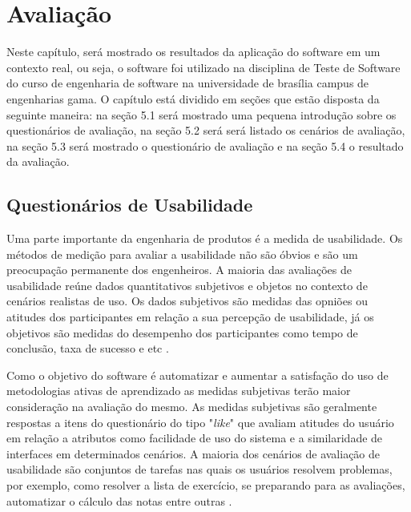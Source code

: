 \chapter{Avaliação}

Neste capítulo, será mostrado os resultados da aplicação do software em um contexto real, ou seja, o software foi
utilizado na disciplina de Teste de Software do curso de engenharia de software na universidade de brasília campus
de engenharias gama. O capítulo está dividido em seções que estão disposta da seguinte maneira: na seção 5.1 será mostrado
uma pequena introdução sobre os questionários de avaliação, na seção 5.2 será será listado os cenários de avaliação, na
seção 5.3 será mostrado o questionário de avaliação e na seção 5.4 o resultado da avaliação.

\section{Questionários de Usabilidade}

Uma parte importante da engenharia de produtos é a medida de usabilidade. Os métodos de medição para avaliar a
usabilidade não são óbvios e são um preocupação permanente dos engenheiros. A maioria das avaliações de usabilidade
reúne dados quantitativos subjetivos e objetos no contexto de cenários realistas de uso. Os dados subjetivos são medidas
das opniões ou atitudes dos participantes em relação a sua percepção de usabilidade, já os objetivos são medidas do
desempenho dos participantes como tempo de conclusão, taxa de sucesso e etc \cite{questionario}.

Como o objetivo do software é automatizar e aumentar a satisfação do uso de metodologias ativas de aprendizado as
medidas subjetivas terão maior consideração na avaliação do mesmo. As medidas subjetivas são geralmente respostas a
itens do questionário do tipo "\textit{like}" que avaliam atitudes do usuário em relação a atributos como facilidade de uso do
sistema e a similaridade de interfaces em determinados cenários. A maioria dos cenários de avaliação de usabilidade são
conjuntos de tarefas nas quais os usuários resolvem problemas, por exemplo, como resolver a lista de exercício, se
preparando para as avaliações, automatizar o cálculo das notas entre outras \cite{questionario}.

